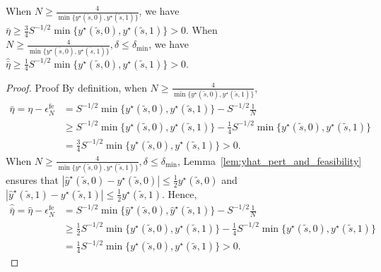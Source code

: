\documentclass[mnsc,nonblindrev]{informs3}
\newcommand{\yhat}{\widehat{y}}
\newcommand{\enfe}{\epsilon_N^{\mathrm{fe}}}
\begin{document}
\begin{APPENDICES}
\begin{lemma}\label{lem:wd-bareta-hatbareta}
When $N\ge\frac{4}{\min\{y^\star(\tilde{s},0),y^\star(\tilde{s},1)\}}$,
we have 
$
    \bar\eta\ge\frac{3}{4}S^{-1/2}\min\{y^\star(\tilde{s},0),y^\star(\tilde{s},1)\}>0.
$
When $N\ge\frac{4}{\min\{y^\star(\tilde{s},0),y^\star(\tilde{s},1)\}}, \delta\le\delta_{\min} $, we have
$
    \widehat{\bar\eta}\ge\frac{1}{4}S^{-1/2}\min\{y^\star(\tilde{s},0),y^\star(\tilde{s},1)\}>0.
$
\end{lemma}
\begin{proof}{Proof}
    By definition, when $N\ge\frac{4}{\min\{y^\star(\tilde{s},0),y^\star(\tilde{s},1)\}}$,
    \begin{align*}
        \bar\eta=\eta-\enfe & =S^{-1/2}\min\{y^\star(\tilde{s},0),y^\star(\tilde{s},1)\}-S^{-1/2}\frac{1}{N} \\
        & \ge S^{-1/2}\min\{y^\star(\tilde{s},0),y^\star(\tilde{s},1)\}-\frac{1}{4}S^{-1/2}\min\{y^\star(\tilde{s},0),y^\star(\tilde{s},1)\}\\
        & = \frac{3}{4}S^{-1/2}\min\{y^\star(\tilde{s},0),y^\star(\tilde{s},1)\}>0.
    \end{align*}
    When $N\ge\frac{4}{\min\{y^\star(\tilde{s},0),y^\star(\tilde{s},1)\}}, \delta\le\delta_{\min} $, Lemma~\ref{lem:yhat_pert_and_feasibility} ensures that 
    $
        |\yhat^\star(\tilde{s},0)-y^\star(\tilde{s},0)|\le \frac{1}{2}y^\star(\tilde{s},0)
    $
    and
    $
    |\yhat^\star(\tilde{s},1)-y^\star(\tilde{s},1)|\le \frac{1}{2}y^\star(\tilde{s},1).
    $
    Hence, 
    \begin{align*}
        \widehat{\bar\eta}=\widehat \eta-\enfe & =S^{-1/2}\min\{\yhat^\star(\tilde{s},0),\yhat^\star(\tilde{s},1)\}-S^{-1/2}\frac{1}{N} \\
        & \ge \frac{1}{2}S^{-1/2}\min\{y^\star(\tilde{s},0),y^\star(\tilde{s},1)\}-\frac{1}{4}S^{-1/2}\min\{y^\star(\tilde{s},0),y^\star(\tilde{s},1)\}\\
        & = \frac{1}{4}S^{-1/2}\min\{y^\star(\tilde{s},0),y^\star(\tilde{s},1)\}>0.
    \end{align*}
\end{proof}


\end{APPENDICES}
\end{document}
